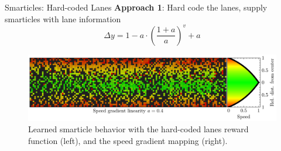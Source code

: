 \documentclass[10pt,xcolor=table, aspectratio=1610]{beamer}
\begin{document}
\begin{frame}{Smarticles: Hard-coded Lanes}
  \textbf{Approach 1}: Hard code the lanes, supply smarticles with lane information\\
  \begin{equation*}
    \Delta y = 1-a\cdot\left(\frac{1+a}{a}\right)^v+a
  \end{equation*}
  \begin{figure}
    \includegraphics[width=\textwidth]{../Thesis/img/results/speed_gradient_0.4.pdf}
    \caption*{Learned smarticle behavior with the hard-coded lanes reward function (left), and the speed gradient mapping (right).}
  \end{figure}
\end{frame}
\end{document}
